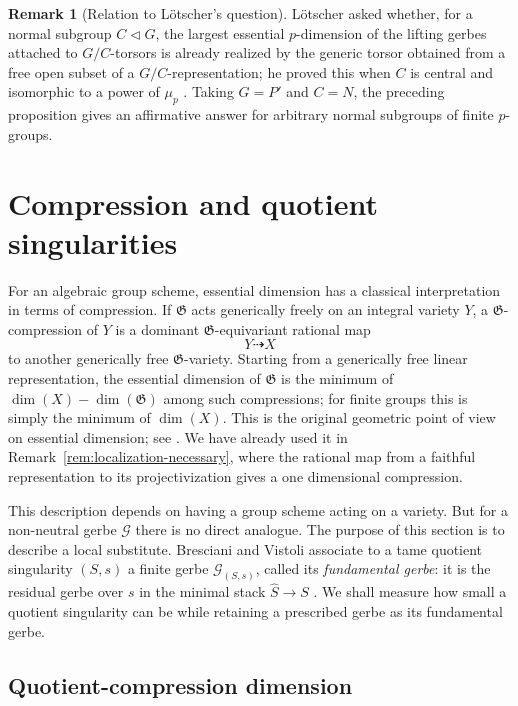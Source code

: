 \documentclass[11pt,reqno]{amsart}
\numberwithin{equation}{section}
\theoremstyle{plain}
\theoremstyle{definition}
\newtheorem{rema}[prop]{Remark}
\def\cG{{\mathcal G}}
\def\fG{{\mathfrak G}}
\begin{document}
\begin{rema}[Relation to L\"otscher's question]
L\"otscher asked whether, for a normal subgroup $C\triangleleft G$, the
largest essential $p$-dimension of the lifting gerbes attached to
$G/C$-torsors is already realized by the generic torsor obtained from a
free open subset of a $G/C$-representation; he proved this
when $C$ is central and isomorphic to a power of $\mu_p$
\cite[Remark~4.4]{LotscherFiber}.  Taking $G=P'$ and $C=N$, the preceding
proposition gives an affirmative answer for arbitrary normal subgroups of finite
$p$-groups.
\end{rema}


\section{Compression and quotient singularities}\label{sec:compression-singularities}

For an algebraic group scheme, essential dimension has a classical
interpretation in terms of compression.  If $\fG$ acts generically freely on
an integral variety $Y$, a $\fG$-compression of $Y$ is a dominant
$\fG$-equivariant rational map
\[
Y\dashrightarrow X
\]
to another generically free $\fG$-variety.  Starting from a generically free
linear representation, the essential dimension of $\fG$ is the minimum of
$\dim(X)-\dim(\fG)$ among such compressions; for finite groups this is simply
the minimum of $\dim(X)$.  This is the original geometric point of view on
essential dimension; see \cite{BuhlerReichstein,ReichsteinED}.  We have
already used it in Remark~\ref{rem:localization-necessary}, where the rational
map from a faithful representation to its projectivization gives a
one dimensional compression.

This description depends on having a group scheme acting on a variety.  But for a
non-neutral gerbe $\cG$ there is no direct analogue. The purpose of this section is to describe a
local substitute.  Bresciani and Vistoli associate to a tame quotient
singularity $(S,s)$ a finite gerbe $\cG_{(S,s)}$, called its
\emph{fundamental gerbe}: it is the residual gerbe over $s$ in the minimal
stack $\widehat S\to S$ \cite[Proposition~6.1 and Definition~6.2]{Bresciani_Vistoli_2024}.
We shall measure how small a quotient singularity can be while retaining a
prescribed gerbe as its fundamental gerbe.

\subsection{Quotient-compression dimension}
\end{document}
